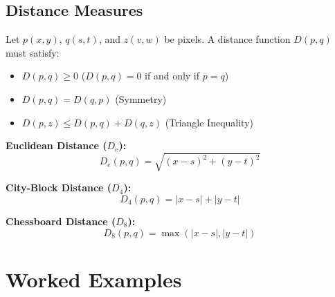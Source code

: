 \documentclass[12pt,a4paper]{article}
\begin{document}
\subsection{Distance Measures}
Let $p(x,y)$, $q(s,t)$, and $z(v,w)$ be pixels. A distance function $D(p,q)$ must satisfy:
\begin{itemize}[leftmargin=*, itemsep=2pt]
  \item $D(p,q) \ge 0$ ($D(p,q) = 0$ if and only if $p = q$)
  \item $D(p,q) = D(q,p)$ (Symmetry)
  \item $D(p,z) \le D(p,q) + D(q,z)$ (Triangle Inequality)
\end{itemize}

\begin{tcolorbox}[formulabox, title={Key Distance Metrics}]
\textbf{Euclidean Distance ($D_e$):}
\begin{equation}
  D_e(p,q) = \sqrt{(x-s)^2 + (y-t)^2}
\end{equation}
\par\noindent
\textbf{City-Block Distance ($D_4$):}
\begin{equation}
  D_4(p,q) = |x-s| + |y-t|
\end{equation}
\par\noindent
\textbf{Chessboard Distance ($D_8$):}
\begin{equation}
  D_8(p,q) = \max(|x-s|, |y-t|)
\end{equation}
\end{tcolorbox}

\section{Worked Examples}
\end{document}
